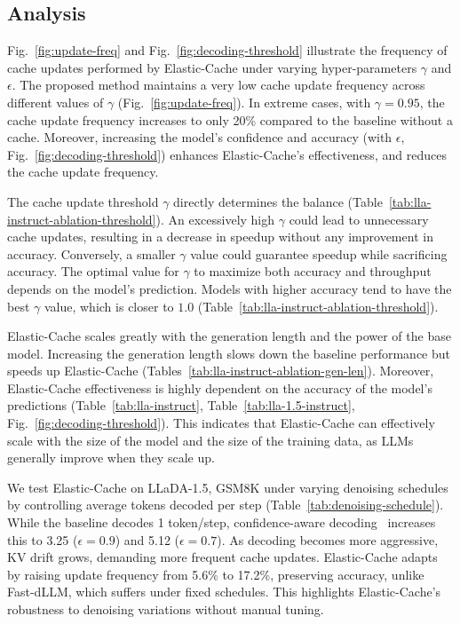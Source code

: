\documentclass{article} %
\theoremstyle{definition}
\theoremstyle{remark}
\begin{document}
\vspace{-0.05in}
\subsection{Analysis}

Fig.~\ref{fig:update-freq} and Fig.~\ref{fig:decoding-threshold} illustrate the frequency of cache updates performed by Elastic-Cache under varying hyper-parameters $\gamma$ and $\epsilon$. The proposed method maintains a very low cache update frequency across different values of $\gamma$ (Fig.~\ref{fig:update-freq}). In extreme cases, with $\gamma=0.95$, the cache update frequency increases to only 20\% compared to the baseline without a cache. Moreover, increasing the model’s confidence and accuracy (with $\epsilon$, Fig.~\ref{fig:decoding-threshold}) enhances Elastic-Cache’s effectiveness, and reduces the cache update frequency.


The cache update threshold $\gamma$ directly determines the balance (Table~\ref{tab:lla-instruct-ablation-threshold}). An excessively high $\gamma$ could lead to unnecessary cache updates, resulting in a decrease in speedup without any improvement in accuracy. Conversely, a smaller $\gamma$ value could guarantee speedup while sacrificing accuracy. The optimal value for $\gamma$ to maximize both accuracy and throughput depends on the model’s prediction. Models with higher accuracy tend to have the best $\gamma$ value, which is closer to $1.0$ (Table~\ref{tab:lla-instruct-ablation-threshold}).

Elastic-Cache scales greatly with the generation length and the power of the base model. Increasing the generation length slows down the baseline performance but speeds up Elastic-Cache (Tables~\ref{tab:lla-instruct-ablation-gen-len}). Moreover, Elastic-Cache effectiveness is highly dependent on the accuracy of the model’s predictions (Table~\ref{tab:lla-instruct}, Table~\ref{tab:lla-1.5-instruct}, Fig.~\ref{fig:decoding-threshold}). This indicates that Elastic-Cache can effectively scale with the size of the model and the size of the training data, as LLMs generally improve when they scale up.


We test Elastic-Cache on LLaDA-1.5, GSM8K under varying denoising schedules by controlling average tokens decoded per step (Table~\ref{tab:denoising-schedule}). While the baseline decodes 1 token/step, confidence-aware decoding~\citep{wu2025fast} increases this to 3.25 ($\epsilon=0.9$) and 5.12 ($\epsilon=0.7$). As decoding becomes more aggressive, KV drift grows, demanding more frequent cache updates. Elastic-Cache adapts by raising update frequency from 5.6\% to 17.2\%, preserving accuracy, unlike Fast-dLLM, which suffers under fixed schedules. This highlights Elastic-Cache's robustness to denoising variations without manual tuning.
\end{document}
